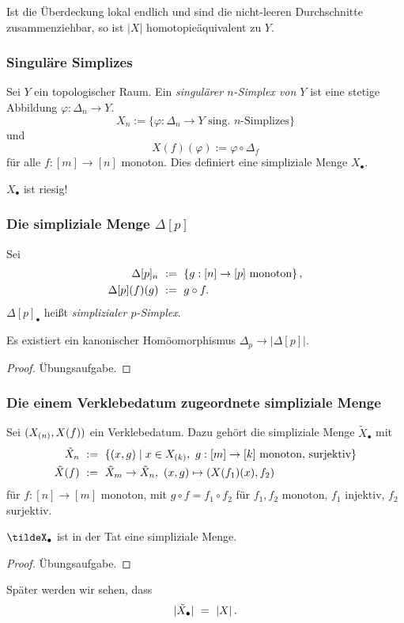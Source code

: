 \begin{bemerkung}
  Ist die Überdeckung lokal endlich und sind die nicht-leeren Durchschnitte
  zusammenziehbar, so ist $|X|$ homotopieäquivalent zu $Y$.
\end{bemerkung}


\subsubsection{Singuläre Simplizes}

\begin{definition}
  Sei $Y$ ein topologischer Raum. Ein \emph{singulärer $n$-Simplex von $Y$}
  ist eine stetige Abbildung $\varphi:\Delta_n \to Y$.
  \[ X_n := \{\varphi:\Delta_n \to Y\text{ sing. $n$-Simplizes}\}\]
  und
  \[ X(f)(\varphi) := \varphi\circ \Delta_f\]
  für alle $f:[m] \to [n]$ monoton. Dies definiert eine simpliziale Menge
  $X_\bullet$.
\end{definition}

\begin{bemerkung}
  $X_\bullet$ ist riesig!
\end{bemerkung}

\subsubsection{Die simpliziale Menge $\Delta[p]$}

\begin{definition}
  Sei
  \begin{align*}
    \Delta[p]_n \ &:=\  \{ g: [n]\to [p] \text{ monoton}\}\,, \\
    \Delta[p](f)(g) \ &:=\  g\circ f.
  \end{align*}
  $\Delta[p]_\bullet$ heißt \emph{simplizialer $p$-Simplex}.
\end{definition}

\begin{lemma}
  Es existiert ein kanonischer Homöomorphismus $\Delta_p \to |\Delta[p]|$.
\end{lemma}
\begin{proof}
  Übungsaufgabe.
\end{proof}


\subsubsection{Die einem Verklebedatum zugeordnete simpliziale Menge}

Sei $(X_{(n)}, X(f))$ ein Verklebedatum. Dazu gehört die simpliziale Menge
$\tilde X_\bullet$ mit
\begin{align*}
  \tilde X_n \speq{&:=} \{ (x,g) \mid x\in X\subk k,\ g:[m]\to [k] 
    \text{ monoton, surjektiv}\}\\
  \tilde X(f) \speq{&:=} \tilde X_m \to \tilde X_n,\ 
    (x,g) \mapsto (X(f_1)(x), f_2)
\end{align*}
für $f: [n]\to [m]$ monoton, mit $g\circ f = f_1 \circ f_2$ für
$f_1,f_2$ monoton, $f_1$ injektiv, $f_2$ surjektiv.

\begin{lemma}
  $\tildeX_\bullet$ ist in der Tat eine simpliziale Menge.
\end{lemma}
\begin{proof}
  Übungsaufgabe.
\end{proof}

\begin{bemerkung}
  Später werden wir sehen, dass
  \[ |\tilde X_\bullet| \ =\  |X| \,.\]
\end{bemerkung}
